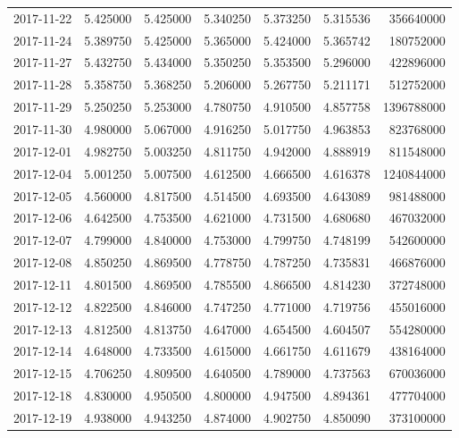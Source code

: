 \begin{tabular}{lrrrrrr}
2017-11-22 &    5.425000 &    5.425000 &    5.340250 &    5.373250 &    5.315536 &   356640000 \\
2017-11-24 &    5.389750 &    5.425000 &    5.365000 &    5.424000 &    5.365742 &   180752000 \\
2017-11-27 &    5.432750 &    5.434000 &    5.350250 &    5.353500 &    5.296000 &   422896000 \\
2017-11-28 &    5.358750 &    5.368250 &    5.206000 &    5.267750 &    5.211171 &   512752000 \\
2017-11-29 &    5.250250 &    5.253000 &    4.780750 &    4.910500 &    4.857758 &  1396788000 \\
2017-11-30 &    4.980000 &    5.067000 &    4.916250 &    5.017750 &    4.963853 &   823768000 \\
2017-12-01 &    4.982750 &    5.003250 &    4.811750 &    4.942000 &    4.888919 &   811548000 \\
2017-12-04 &    5.001250 &    5.007500 &    4.612500 &    4.666500 &    4.616378 &  1240844000 \\
2017-12-05 &    4.560000 &    4.817500 &    4.514500 &    4.693500 &    4.643089 &   981488000 \\
2017-12-06 &    4.642500 &    4.753500 &    4.621000 &    4.731500 &    4.680680 &   467032000 \\
2017-12-07 &    4.799000 &    4.840000 &    4.753000 &    4.799750 &    4.748199 &   542600000 \\
2017-12-08 &    4.850250 &    4.869500 &    4.778750 &    4.787250 &    4.735831 &   466876000 \\
2017-12-11 &    4.801500 &    4.869500 &    4.785500 &    4.866500 &    4.814230 &   372748000 \\
2017-12-12 &    4.822500 &    4.846000 &    4.747250 &    4.771000 &    4.719756 &   455016000 \\
2017-12-13 &    4.812500 &    4.813750 &    4.647000 &    4.654500 &    4.604507 &   554280000 \\
2017-12-14 &    4.648000 &    4.733500 &    4.615000 &    4.661750 &    4.611679 &   438164000 \\
2017-12-15 &    4.706250 &    4.809500 &    4.640500 &    4.789000 &    4.737563 &   670036000 \\
2017-12-18 &    4.830000 &    4.950500 &    4.800000 &    4.947500 &    4.894361 &   477704000 \\
2017-12-19 &    4.938000 &    4.943250 &    4.874000 &    4.902750 &    4.850090 &   373100000 \\

\end{tabular}
